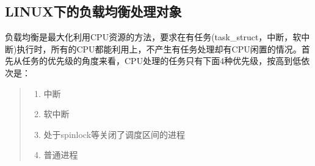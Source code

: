 
\newcommand{\VerbBar}{|}
\newcommand{\VERB}{\Verb[commandchars=\\\{\}]}
\newenvironment{Shaded}{}{}
\newcommand{\AlertTok}[1]{\textcolor[rgb]{1.00,0.00,0.00}{\textbf{#1}}}
\newcommand{\AnnotationTok}[1]{\textcolor[rgb]{0.38,0.63,0.69}{\textbf{\textit{#1}}}}
\newcommand{\AttributeTok}[1]{\textcolor[rgb]{0.49,0.56,0.16}{#1}}
\newcommand{\BaseNTok}[1]{\textcolor[rgb]{0.25,0.63,0.44}{#1}}
\newcommand{\BuiltInTok}[1]{#1}
\newcommand{\CharTok}[1]{\textcolor[rgb]{0.25,0.44,0.63}{#1}}
\newcommand{\CommentTok}[1]{\textcolor[rgb]{0.38,0.63,0.69}{\textit{#1}}}
\newcommand{\CommentVarTok}[1]{\textcolor[rgb]{0.38,0.63,0.69}{\textbf{\textit{#1}}}}
\newcommand{\ConstantTok}[1]{\textcolor[rgb]{0.53,0.00,0.00}{#1}}
\newcommand{\ControlFlowTok}[1]{\textcolor[rgb]{0.00,0.44,0.13}{\textbf{#1}}}
\newcommand{\DataTypeTok}[1]{\textcolor[rgb]{0.56,0.13,0.00}{#1}}
\newcommand{\DecValTok}[1]{\textcolor[rgb]{0.25,0.63,0.44}{#1}}
\newcommand{\DocumentationTok}[1]{\textcolor[rgb]{0.73,0.13,0.13}{\textit{#1}}}
\newcommand{\ErrorTok}[1]{\textcolor[rgb]{1.00,0.00,0.00}{\textbf{#1}}}
\newcommand{\ExtensionTok}[1]{#1}
\newcommand{\FloatTok}[1]{\textcolor[rgb]{0.25,0.63,0.44}{#1}}
\newcommand{\FunctionTok}[1]{\textcolor[rgb]{0.02,0.16,0.49}{#1}}
\newcommand{\ImportTok}[1]{#1}
\newcommand{\InformationTok}[1]{\textcolor[rgb]{0.38,0.63,0.69}{\textbf{\textit{#1}}}}
\newcommand{\KeywordTok}[1]{\textcolor[rgb]{0.00,0.44,0.13}{\textbf{#1}}}
\newcommand{\NormalTok}[1]{#1}
\newcommand{\OperatorTok}[1]{\textcolor[rgb]{0.40,0.40,0.40}{#1}}
\newcommand{\OtherTok}[1]{\textcolor[rgb]{0.00,0.44,0.13}{#1}}
\newcommand{\PreprocessorTok}[1]{\textcolor[rgb]{0.74,0.48,0.00}{#1}}
\newcommand{\RegionMarkerTok}[1]{#1}
\newcommand{\SpecialCharTok}[1]{\textcolor[rgb]{0.25,0.44,0.63}{#1}}
 

\hypertarget{header-n2}{%
\subsection{LINUX下的负载均衡处理对象}\label{header-n2}}

负载均衡是最大化利用CPU资源的方法，要求在有任务(task\_struct，中断，软中断)执行时，所有的CPU都能利用上，不产生有任务处理却有CPU闲置的情况。首先从任务的优先级的角度来看，CPU处理的任务只有下面4种优先级，按高到低依次是：

\begin{quote}
\begin{enumerate}
\def\labelenumi{\arabic{enumi}.}
\item
  中断
\item
  软中断
\item
  处于spinlock等关闭了调度区间的进程
\item
  普通进程
\end{enumerate}
\end{quote}

